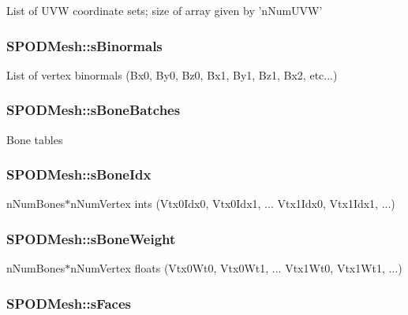 List of U\+V\+W coordinate sets; size of array given by 'n\+Num\+U\+V\+W' \hypertarget{struct_s_p_o_d_mesh_aeb1d6c362821382a0147f2b7178853f2}{
\subsubsection[{s\+Binormals}]{ S\+P\+O\+D\+Mesh\+::s\+Binormals}}\label{struct_s_p_o_d_mesh_aeb1d6c362821382a0147f2b7178853f2}
List of vertex binormals (Bx0, By0, Bz0, Bx1, By1, Bz1, Bx2, etc...) \hypertarget{struct_s_p_o_d_mesh_a93a3f52d85cfced3b574ebb58d335f51}{
\subsubsection[{s\+Bone\+Batches}]{ S\+P\+O\+D\+Mesh\+::s\+Bone\+Batches}}\label{struct_s_p_o_d_mesh_a93a3f52d85cfced3b574ebb58d335f51}
Bone tables \hypertarget{struct_s_p_o_d_mesh_a381945f44d8d3b9582bc7fef853b7055}{
\subsubsection[{s\+Bone\+Idx}]{ S\+P\+O\+D\+Mesh\+::s\+Bone\+Idx}}\label{struct_s_p_o_d_mesh_a381945f44d8d3b9582bc7fef853b7055}
n\+Num\+Bones$\ast$n\+Num\+Vertex ints (Vtx0\+Idx0, Vtx0\+Idx1, ... Vtx1\+Idx0, Vtx1\+Idx1, ...) \hypertarget{struct_s_p_o_d_mesh_afe386a295ca2f8bf7b2348231336f293}{
\subsubsection[{s\+Bone\+Weight}]{ S\+P\+O\+D\+Mesh\+::s\+Bone\+Weight}}\label{struct_s_p_o_d_mesh_afe386a295ca2f8bf7b2348231336f293}
n\+Num\+Bones$\ast$n\+Num\+Vertex floats (Vtx0\+Wt0, Vtx0\+Wt1, ... Vtx1\+Wt0, Vtx1\+Wt1, ...) \hypertarget{struct_s_p_o_d_mesh_a912c3225b227efaef8f86fd2d9448eb6}{
\subsubsection[{s\+Faces}]{ S\+P\+O\+D\+Mesh\+::s\+Faces}}\label{struct_s_p_o_d_mesh_a912c3225b227efaef8f86fd2d9448eb6}
